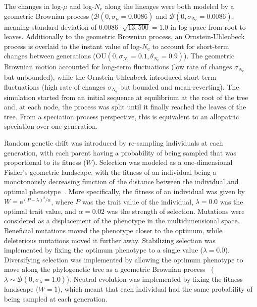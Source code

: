 \documentclass{article}
\newcommand{\Multiply}{\cdot}
\newcommand{\e}{\text{e}}
\newcommand{\Ne}{N_{\text{e}}}
\newcommand{\Trait}{P}
\newcommand{\MutationRate}{\mu}
\newcommand{\brownian}{\mathcal{B}}
\begin{document}
The changes in log-$\MutationRate$ and log-$\Ne$ along the lineages were both modeled by a geometric Brownian process ($\brownian \left(0, \sigma_{\MutationRate}=0.0086\right)$ and $\brownian \left(0, \sigma_{\Ne}=0.0086\right)$, meaning standard deviation of $0.0086 \Multiply \sqrt {13,500} = 1.0$ in log-space from root to leaves.
Additionally to the geometric Brownian process, an Ornstein-Uhlenbeck process is overlaid to the instant value of log-$\Ne$ to account for short-term changes between generations ($\text{OU} \left(0, \sigma_{\Ne}=0.1, \theta_{\Ne}=0.9\right)$).
The geometric Brownian motion accounted for long-term fluctuations (low rate of changes $\sigma_{\Ne}$ but unbounded), while the Ornstein-Uhlenbeck introduced short-term fluctuations (high rate of changes $\sigma_{\Ne}$ but bounded and mean-reverting).
The simulation started from an initial sequence at equilibrium at the root of the tree and, at each node, the process was split until it finally reached the leaves of the tree.
From a speciation process perspective, this is equivalent to an allopatric speciation over one generation.


Random genetic drift was introduced by re-sampling individuals at each generation, with each parent having a probability of being sampled that was proportional to its fitness ($W$).
Selection was modeled as a one-dimensional Fisher's geometric landscape, with the fitness of an individual being a monotonously decreasing function of the distance between the individual and optimal phenotype~\parencite{tenaillon_utility_2014,blanquart_epistasis_2016}.
More specifically, the fitness of an individual was given by $W = \e^{(\Trait - \lambda)^2/ \alpha}$, where $\Trait$ was the trait value of the individual, $\lambda=0.0$ was the optimal trait value, and $\alpha=0.02$ was the strength of selection.
Mutations were considered as a displacement of the phenotype in the multidimensional space.
Beneficial mutations moved the phenotype closer to the optimum, while deleterious mutations moved it further away.
Stabilizing selection was implemented by fixing the optimum phenotype to a single value ($\lambda=0.0$).
Diversifying selection was implemented by allowing the optimum phenotype to move along the phylogenetic tree as a geometric Brownian process~\parencite{hansen_stabilizing_1997} ($\lambda \sim \brownian \left(0, \sigma_{\lambda}=1.0\right)$).
Neutral evolution was implemented by fixing the fitness landscape ($W=1$), which meant that each individual had the same probability of being sampled at each generation.
\end{document}
